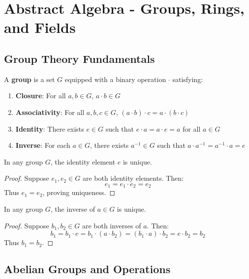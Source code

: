 \chapter{Abstract Algebra - Groups, Rings, and Fields}
\label{ch:abstract-algebra}

\section{Group Theory Fundamentals}
\label{sec:group-fundamentals}

A \textbf{group} is a set $G$ equipped with a binary operation $\cdot$ satisfying:

\begin{enumerate}
\item \textbf{Closure}: For all $a, b \in G$, $a \cdot b \in G$
\item \textbf{Associativity}: For all $a, b, c \in G$, $(a \cdot b) \cdot c = a \cdot (b \cdot c)$
\item \textbf{Identity}: There exists $e \in G$ such that $e \cdot a = a \cdot e = a$ for all $a \in G$
\item \textbf{Inverse}: For each $a \in G$, there exists $a^{-1} \in G$ such that $a \cdot a^{-1} = a^{-1} \cdot a = e$
\end{enumerate}

\begin{theorem}
\label{thm:identity-existence}
In any group $G$, the identity element $e$ is unique.
\end{theorem}

\begin{proof}
Suppose $e_1, e_2 \in G$ are both identity elements. Then:
\[ e_1 = e_1 \cdot e_2 = e_2 \]
Thus $e_1 = e_2$, proving uniqueness.
\end{proof}

\begin{theorem}
\label{thm:inverse-uniqueness}
In any group $G$, the inverse of $a \in G$ is unique.
\end{theorem}

\begin{proof}
Suppose $b_1, b_2 \in G$ are both inverses of $a$. Then:
\[ b_1 = b_1 \cdot e = b_1 \cdot (a \cdot b_2) = (b_1 \cdot a) \cdot b_2 = e \cdot b_2 = b_2 \]
Thus $b_1 = b_2$.
\end{proof}

\section{Abelian Groups and Operations}
\label{sec:abelian-groups}

